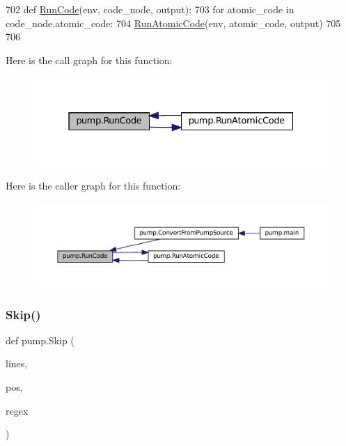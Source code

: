 \begin{DoxyCode}
702 \textcolor{keyword}{def }\hyperlink{namespacepump_ac6a714a44e28c2a19a1dfabeb9c9d4f1}{RunCode}(env, code\_node, output):
703   \textcolor{keywordflow}{for} atomic\_code \textcolor{keywordflow}{in} code\_node.atomic\_code:
704     \hyperlink{namespacepump_a901e6abd34691a0d779178a615cc09c1}{RunAtomicCode}(env, atomic\_code, output)
705 
706 
\end{DoxyCode}
Here is the call graph for this function\+:
\nopagebreak
\begin{figure}[H]
\begin{center}
\leavevmode
\includegraphics[width=331pt]{namespacepump_ac6a714a44e28c2a19a1dfabeb9c9d4f1_cgraph}
\end{center}
\end{figure}
Here is the caller graph for this function\+:
\nopagebreak
\begin{figure}[H]
\begin{center}
\leavevmode
\includegraphics[width=350pt]{namespacepump_ac6a714a44e28c2a19a1dfabeb9c9d4f1_icgraph}
\end{center}
\end{figure}
\mbox{\label{namespacepump_a869bd8932d9ee97f3a0e789abd05d590}} 
\subsubsection{\texorpdfstring{Skip()}{Skip()}}
{\footnotesize\ttfamily def pump.\+Skip (\begin{DoxyParamCaption}\item[{}]{lines,  }\item[{}]{pos,  }\item[{}]{regex }\end{DoxyParamCaption})}



